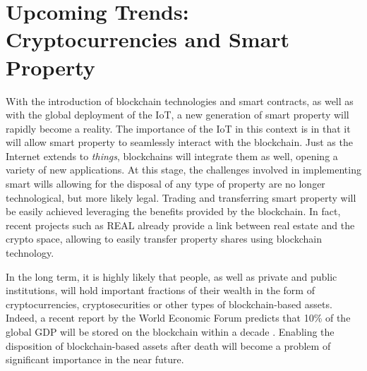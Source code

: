\section{Upcoming Trends: Cryptocurrencies and Smart Property} %
\label{sec:cryptocurrencies_and_smart_property_the_legacy_vision}

With the introduction of blockchain technologies and smart contracts, as well as with the global deployment of the IoT, a new generation of smart property will rapidly become a reality.
The importance of the IoT in this context is in that it will allow smart property to seamlessly interact with the blockchain. 
Just as the Internet extends to \textit{things}, blockchains will integrate them as well, opening a variety of new applications.
At this stage, the challenges involved in implementing smart wills allowing for the disposal of any type of property are no longer technological, but more likely legal. Trading and transferring smart property will be easily achieved leveraging the benefits provided by the blockchain. %
In fact, recent projects such as REAL \cite{REAL} already provide a link between real estate and the crypto space, allowing to easily transfer property shares using blockchain technology.


In the long term, it is highly likely that people, as well as private and public institutions, will hold important fractions of their wealth in the form of cryptocurrencies, cryptosecurities or other types of blockchain-based assets. Indeed, a recent report by the World Economic Forum predicts that 10\% of the global GDP will be stored on the blockchain within a decade \cite{WEF2017}.  
Enabling the disposition of blockchain-based assets after death will become a problem of significant importance in the near future.





